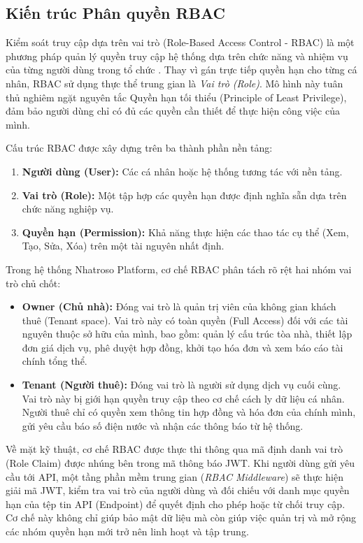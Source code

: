 \subsection{Kiến trúc Phân quyền RBAC}
Kiểm soát truy cập dựa trên vai trò (Role-Based Access Control - RBAC) là một phương pháp quản lý quyền truy cập hệ thống dựa trên chức năng và nhiệm vụ của từng người dùng trong tổ chức \cite{RBAC}. Thay vì gán trực tiếp quyền hạn cho từng cá nhân, RBAC sử dụng thực thể trung gian là \textit{Vai trò (Role)}. Mô hình này tuân thủ nghiêm ngặt nguyên tắc Quyền hạn tối thiểu (Principle of Least Privilege), đảm bảo người dùng chỉ có đủ các quyền cần thiết để thực hiện công việc của mình.

Cấu trúc RBAC được xây dựng trên ba thành phần nền tảng:
\begin{enumerate}
    \item \textbf{Người dùng (User):} Các cá nhân hoặc hệ thống tương tác với nền tảng.
    \item \textbf{Vai trò (Role):} Một tập hợp các quyền hạn được định nghĩa sẵn dựa trên chức năng nghiệp vụ.
    \item \textbf{Quyền hạn (Permission):} Khả năng thực hiện các thao tác cụ thể (Xem, Tạo, Sửa, Xóa) trên một tài nguyên nhất định.
\end{enumerate}

Trong hệ thống Nhatroso Platform, cơ chế RBAC phân tách rõ rệt hai nhóm vai trò chủ chốt:

\begin{itemize}
    \item \textbf{Owner (Chủ nhà):} Đóng vai trò là quản trị viên của không gian khách thuê (Tenant space). Vai trò này có toàn quyền (Full Access) đối với các tài nguyên thuộc sở hữu của mình, bao gồm: quản lý cấu trúc tòa nhà, thiết lập đơn giá dịch vụ, phê duyệt hợp đồng, khởi tạo hóa đơn và xem báo cáo tài chính tổng thể.
    \item \textbf{Tenant (Người thuê):} Đóng vai trò là người sử dụng dịch vụ cuối cùng. Vai trò này bị giới hạn quyền truy cập theo cơ chế cách ly dữ liệu cá nhân. Người thuê chỉ có quyền xem thông tin hợp đồng và hóa đơn của chính mình, gửi yêu cầu báo số điện nước và nhận các thông báo từ hệ thống.
\end{itemize}

Về mặt kỹ thuật, cơ chế RBAC được thực thi thông qua mã định danh vai trò (Role Claim) được nhúng bên trong mã thông báo JWT. Khi người dùng gửi yêu cầu tới API, một tầng phần mềm trung gian (\textit{RBAC Middleware}) sẽ thực hiện giải mã JWT, kiểm tra vai trò của người dùng và đối chiếu với danh mục quyền hạn của tệp tin API (Endpoint) để quyết định cho phép hoặc từ chối truy cập. Cơ chế này không chỉ giúp bảo mật dữ liệu mà còn giúp việc quản trị và mở rộng các nhóm quyền hạn mới trở nên linh hoạt và tập trung.

